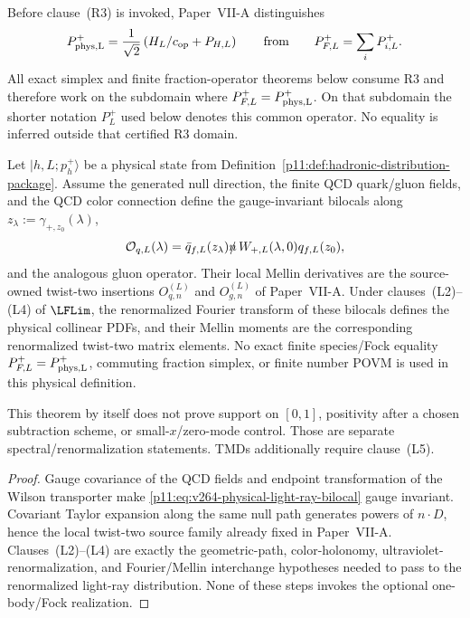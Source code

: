 \documentclass[12pt,a4paper]{article}
\begin{document}
\begin{remark}
\label{p11:rem:v252-physical-fock-plus-distinction}
Before clause~\textnormal{(R3)} is invoked, Paper~VII-A distinguishes
\[
 P_{\rm phys,L}^+=\frac1{\sqrt2}
 \left(H_L/c_{\rm op}+P_{H,L}\right)
 \qquad\text{from}\qquad
 P_{F,L}^+=\sum_iP_{i,L}^+.
\]
All exact simplex and finite fraction-operator theorems below consume R3 and
therefore work on the subdomain where
\(P_{F,L}^+=P_{\rm phys,L}^+\).  On that subdomain the shorter notation
\(P_L^+\) used below denotes this common operator.  No equality is inferred
outside that certified R3 domain.
\end{remark}

\begin{theorem}
\label{p11:thm:lf-wilson-line-identification}
Let \(|h,L;p_h^+\rangle\) be a physical state from
Definition~\ref{p11:def:hadronic-distribution-package}.  Assume the generated null direction, the finite QCD quark/gluon fields, and
the QCD color connection define the gauge-invariant bilocals along \(z_\lambda:=\gamma_{+,z_0}(\lambda)\),
\begin{equation}
\label{p11:eq:v264-physical-light-ray-bilocal}
 \mathcal O_{q,L}(\lambda)
 =\bar q_{f,L}(z_\lambda)\slashed n\,
 W_{+,L}(\lambda,0)q_{f,L}(z_0),
\end{equation}
and the analogous gluon operator.  Their local Mellin derivatives are the
source-owned twist-two insertions \(O_{q,n}^{(L)}\) and \(O_{g,n}^{(L)}\) of
Paper~VII-A.  Under clauses~\textnormal{(L2)--(L4)} of \(\LFLim\), the
renormalized Fourier transform of these bilocals defines the physical collinear
PDFs, and their Mellin moments are the corresponding renormalized twist-two
matrix elements.  No exact finite species/Fock equality
\(P_{F,L}^+=P_{\rm phys,L}^+\), commuting fraction simplex, or finite number
POVM is used in this physical definition.

This theorem by itself does not prove support on \([0,1]\), positivity after a
chosen subtraction scheme, or small-\(x\)/zero-mode control.  Those are separate
spectral/renormalization statements.  TMDs additionally require
clause~\textnormal{(L5)}.
\end{theorem}
\begin{proof}
Gauge covariance of the QCD fields and endpoint transformation of the Wilson
transporter make \eqref{p11:eq:v264-physical-light-ray-bilocal} gauge invariant.
Covariant Taylor expansion along the same null path generates powers of
\(n\!\cdot\!D\), hence the local twist-two source family already fixed in
Paper~VII-A.  Clauses~\textnormal{(L2)--(L4)} are exactly the geometric-path,
color-holonomy, ultraviolet-renormalization, and Fourier/Mellin interchange
hypotheses needed to pass to the renormalized light-ray distribution.  None of
these steps invokes the optional one-body/Fock realization.
\end{proof}
\end{document}
